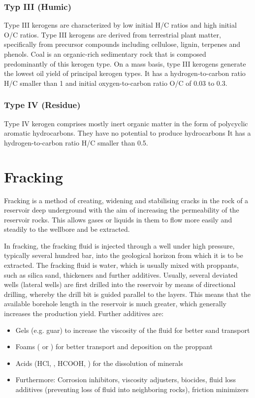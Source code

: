 \subsubsection{Typ III (Humic)}
Type III kerogens are characterized by low initial H/C ratios and high initial O/C ratios.
Type III kerogens are derived from terrestrial plant matter, specifically from precursor compounds including cellulose, lignin, terpenes and phenols.
Coal is an organic-rich sedimentary rock that is composed predominantly of this kerogen type.
On a mass basis, type III kerogens generate the lowest oil yield of principal kerogen types.
It has a hydrogen-to-carbon ratio H/C smaller than 1 and initial oxygen-to-carbon ratio O/C of 0.03 to 0.3.

\subsubsection{Type IV (Residue)}
Type IV kerogen comprises mostly inert organic matter in the form of polycyclic aromatic hydrocarbons.
They have no potential to produce hydrocarbons
It has a hydrogen-to-carbon ratio H/C smaller than 0.5.

\section{Fracking}
Fracking is a method of creating, widening and stabilising cracks in the rock of a reservoir deep underground with the aim of increasing the permeability of the reservoir rocks.
This allows gases or liquids in them to flow more easily and steadily to the wellbore and be extracted.

In fracking, the fracking fluid is injected through a well under high pressure, typically several hundred bar, into the geological horizon from which it is to be extracted.
The fracking fluid is water, which is usually mixed with proppants, such as silica sand, thickeners and further additives.
Usually, several deviated wells (lateral wells) are first drilled into the reservoir by means of directional drilling, whereby the drill bit is guided parallel to the layers.
This means that the available borehole length in the reservoir is much greater, which generally increases the production yield.
Further additives are:

\begin{itemize}
    \item Gels (e.g. guar) to increase the viscosity of the fluid for better sand transport
    \item Foams ( or ) for better transport and deposition on the proppant
    \item Acids (HCl, , HCOOH, ) for the dissolution of minerals
    \item Furthermore: Corrosion inhibitors, viscosity adjusters, biocides, fluid loss additives (preventing loss of fluid into neighboring rocks), friction minimizers
\end{itemize}

